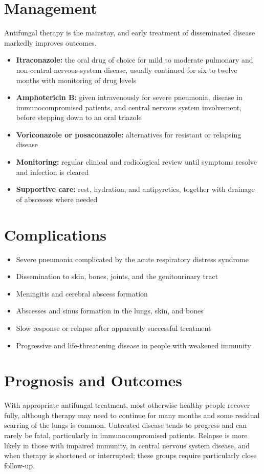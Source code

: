 \section*{Management}
Antifungal therapy is the mainstay, and early treatment of disseminated disease markedly improves outcomes.

\begin{itemize}
    \item \textbf{Itraconazole:} the oral drug of choice for mild to moderate pulmonary and non-central-nervous-system disease, usually continued for six to twelve months with monitoring of drug levels
    \item \textbf{Amphotericin B:} given intravenously for severe pneumonia, disease in immunocompromised patients, and central nervous system involvement, before stepping down to an oral triazole
    \item \textbf{Voriconazole or posaconazole:} alternatives for resistant or relapsing disease
    \item \textbf{Monitoring:} regular clinical and radiological review until symptoms resolve and infection is cleared
    \item \textbf{Supportive care:} rest, hydration, and antipyretics, together with drainage of abscesses where needed
\end{itemize}

\section*{Complications}
\begin{itemize}
    \item Severe pneumonia complicated by the acute respiratory distress syndrome
    \item Dissemination to skin, bones, joints, and the genitourinary tract
    \item Meningitis and cerebral abscess formation
    \item Abscesses and sinus formation in the lungs, skin, and bones
    \item Slow response or relapse after apparently successful treatment
    \item Progressive and life-threatening disease in people with weakened immunity
\end{itemize}

\section*{Prognosis and Outcomes}
With appropriate antifungal treatment, most otherwise healthy people recover fully, although therapy may need to continue for many months and some residual scarring of the lungs is common. Untreated disease tends to progress and can rarely be fatal, particularly in immunocompromised patients. Relapse is more likely in those with impaired immunity, in central nervous system disease, and when therapy is shortened or interrupted; these groups require particularly close follow-up.

